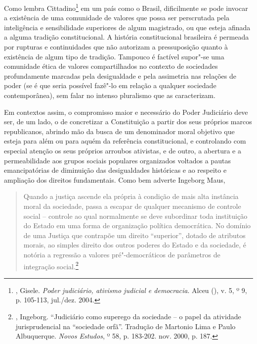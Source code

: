 Como lembra Cittadino\footnote{, Gisele. \emph{Poder
  judiciário, ativismo judicial e democracia}. Alceu (), v. 5, º
  9, p. 105-113, jul./dez. 2004.} em um país como o Brasil, dificilmente
se pode invocar a existência de uma comunidade de valores que possa ser
perscrutada pela inteligência e sensibilidade superiores de algum
magistrado, ou que esteja afinada a alguma tradição constitucional. A
história constitucional brasileira é permeada por rupturas e
continuidades que não autorizam a pressuposição quanto à existência de
algum tipo de tradição. Tampouco é factível supor"-se uma comunidade
ética de valores compartilhados no contexto de sociedades profundamente
marcadas pela desigualdade e pela assimetria nas relações de poder (se é
que seria possível fazê"-lo em relação a qualquer sociedade
contemporânea), sem falar no intenso pluralismo que as caracterizam.

Em contextos assim, o compromisso maior e necessário do Poder Judiciário
deve ser, de um lado, o de concretizar a Constituição a partir dos seus
próprios marcos republicanos, abrindo mão da busca de um denominador
moral objetivo que esteja para além ou para aquém da referência
constitucional, e controlando com especial atenção os seus próprios
arroubos ativistas, e de outro, a abertura e a permeabilidade aos grupos
sociais populares organizados voltados a pautas emancipatórias de
diminuição das desigualdades históricas e ao respeito e ampliação dos
direitos fundamentais. Como bem adverte Ingeborg Maus,

\begin{quote}
Quando a justiça ascende ela própria à condição de mais alta instância
moral da sociedade, passa a escapar de qualquer mecanismo de controle
social -- controle ao qual normalmente se deve subordinar toda
instituição do Estado em uma forma de organização política democrática.
No domínio de uma Justiça que contrapõe um direito ``superior'', dotado de
atributos morais, ao simples direito dos outros poderes do Estado e da
sociedade, é notória a regressão a valores pré"-democráticos de
parâmetros de integração social.\footnote{, Ingeborg. ``Judiciário
  como superego da sociedade -- o papel da atividade jurisprudencial na
  ``sociedade orfã''. Tradução de Martonio Lima e Paulo Albuquerque.
  \emph{Novos Estudos}, º 58, p. 183-202. nov. 2000, p. 187.}
\end{quote}


